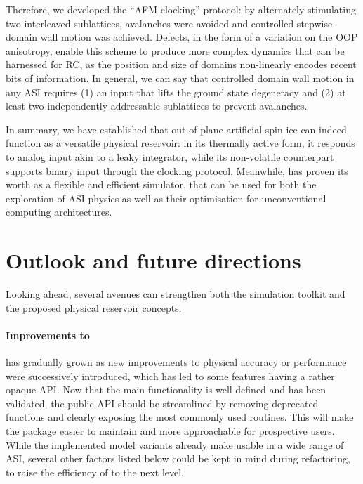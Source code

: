 Therefore, we developed the ``AFM clocking'' protocol: by alternately stimulating two interleaved sublattices, avalanches were avoided and controlled stepwise domain wall motion was achieved.
Defects, in the form of a variation on the OOP anisotropy, enable this scheme to produce more complex dynamics that can be harnessed for RC, as the position and size of domains non-linearly encodes recent bits of information.
In general, we can say that controlled domain wall motion in any ASI requires (1) an input that lifts the ground state degeneracy and (2) at least two independently addressable sublattices to prevent avalanches. \\\par

In summary, we have established that out-of-plane artificial spin ice can indeed function as a versatile physical reservoir: in its thermally active form, it responds to analog input akin to a leaky integrator, while its non-volatile counterpart supports binary input through the clocking protocol. %
Meanwhile, \hotspice has proven its worth as a flexible and efficient simulator, that can be used for both the exploration of ASI physics as well as their optimisation for unconventional computing architectures.

\newpage
\section{Outlook and future directions}
Looking ahead, several avenues can strengthen both the \hotspice simulation toolkit and the proposed physical reservoir concepts.

\paragraph{Improvements to \hotspice}
\hotspice has gradually grown as new improvements to physical accuracy or performance were successively introduced, which has led to some features having a rather opaque API.
Now that the main functionality is well-defined and has been validated, the public API should be streamlined by removing deprecated functions and clearly exposing the most commonly used routines. %
This will make the package easier to maintain and more approachable for prospective users.
While the implemented model variants already make \hotspice usable in a wide range of ASI, several other factors listed below could be kept in mind during refactoring, to raise the efficiency of \hotspice to the next level. \\\par

